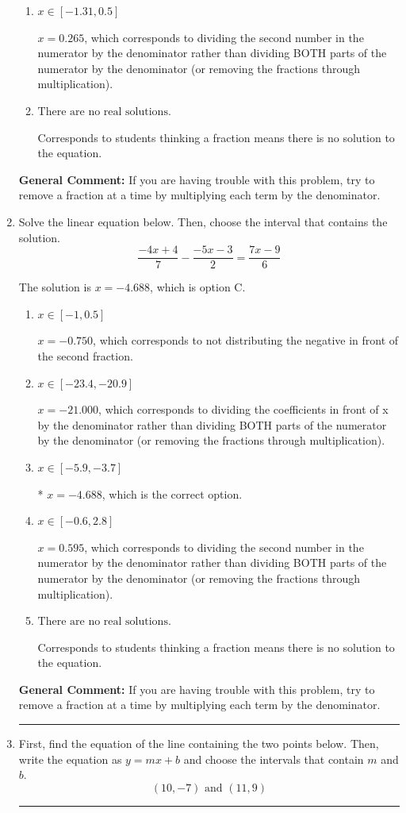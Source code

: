 \documentclass{extbook}[14pt]
\newcommand{\litem}[1]{\item #1

\rule{\textwidth}{0.4pt}}
\begin{document}
\begin{enumerate}
{\begin{enumerate}[label=\Alph*.]
 $x = -1.314$, which corresponds to not distributing the negative in front of the second fraction.
\item \( x \in [-1.31, 0.5] \)

 $x = 0.265$, which corresponds to dividing the second number in the numerator by the denominator rather than dividing BOTH parts of the numerator by the denominator (or removing the fractions through multiplication).
\item \( \text{There are no real solutions.} \)

Corresponds to students thinking a fraction means there is no solution to the equation.
\end{enumerate}

\textbf{General Comment:} If you are having trouble with this problem, try to remove a fraction at a time by multiplying each term by the denominator.
}
\litem{
Solve the linear equation below. Then, choose the interval that contains the solution.
\[ \frac{-4x + 4}{7} - \frac{-5x -3}{2} = \frac{7x -9}{6} \]

The solution is \( x = -4.688 \), which is option C.\begin{enumerate}[label=\Alph*.]
\item \( x \in [-1, 0.5] \)

 $x = -0.750$, which corresponds to not distributing the negative in front of the second fraction.
\item \( x \in [-23.4, -20.9] \)

 $x = -21.000$, which corresponds to dividing the coefficients in front of x by the denominator rather than dividing BOTH parts of the numerator by the denominator (or removing the fractions through multiplication).
\item \( x \in [-5.9, -3.7] \)

* $x = -4.688$, which is the correct option.
\item \( x \in [-0.6, 2.8] \)

 $x = 0.595$, which corresponds to dividing the second number in the numerator by the denominator rather than dividing BOTH parts of the numerator by the denominator (or removing the fractions through multiplication).
\item \( \text{There are no real solutions.} \)

Corresponds to students thinking a fraction means there is no solution to the equation.
\end{enumerate}

\textbf{General Comment:} If you are having trouble with this problem, try to remove a fraction at a time by multiplying each term by the denominator.
}
\litem{
First, find the equation of the line containing the two points below. Then, write the equation as $ y=mx+b $ and choose the intervals that contain $m$ and $b$.
\[ (10, -7) \text{ and } (11, 9) \]

}
\end{enumerate}
\end{document}
